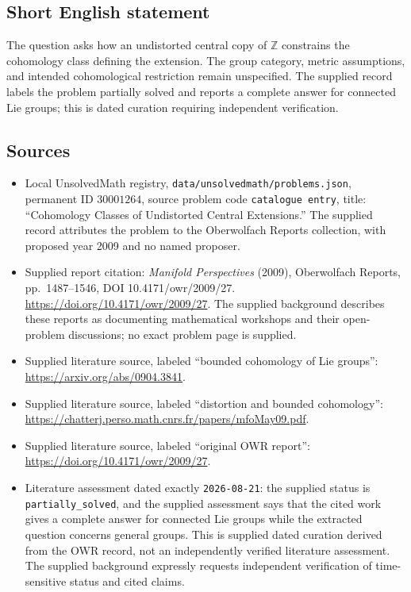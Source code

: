 \documentclass[11pt]{article}
\newcommand{\Z}{\mathbb{Z}}
\begin{document}
\subsection{Short English statement}
The question asks how an undistorted central copy of \(\Z\) constrains the cohomology class defining the extension. The group category, metric assumptions, and intended cohomological restriction remain unspecified. The supplied record labels the problem partially solved and reports a complete answer for connected Lie groups; this is dated curation requiring independent verification.
\subsection{Sources}
\begin{itemize}
\item Local UnsolvedMath registry, \texttt{data/unsolvedmath/problems.json}, permanent ID \(30001264\), source problem code \texttt{catalogue entry}, title: ``Cohomology Classes of Undistorted Central Extensions.'' The supplied record attributes the problem to the Oberwolfach Reports collection, with proposed year 2009 and no named proposer.
\item Supplied report citation: \emph{Manifold Perspectives} (2009), Oberwolfach Reports, pp.~1487--1546, DOI 10.4171/owr/2009/27. \url{https://doi.org/10.4171/owr/2009/27}. The supplied background describes these reports as documenting mathematical workshops and their open-problem discussions; no exact problem page is supplied.
\item Supplied literature source, labeled ``bounded cohomology of Lie groups'': \url{https://arxiv.org/abs/0904.3841}.
\item Supplied literature source, labeled ``distortion and bounded cohomology'': \url{https://chatterj.perso.math.cnrs.fr/papers/mfoMay09.pdf}.
\item Supplied literature source, labeled ``original OWR report'': \url{https://doi.org/10.4171/owr/2009/27}.
\item Literature assessment dated exactly \texttt{2026-08-21}: the supplied status is \texttt{partially\_solved}, and the supplied assessment says that the cited work gives a complete answer for connected Lie groups while the extracted question concerns general groups. This is supplied dated curation derived from the OWR record, not an independently verified literature assessment. The supplied background expressly requests independent verification of time-sensitive status and cited claims.
\end{itemize}
\end{document}
